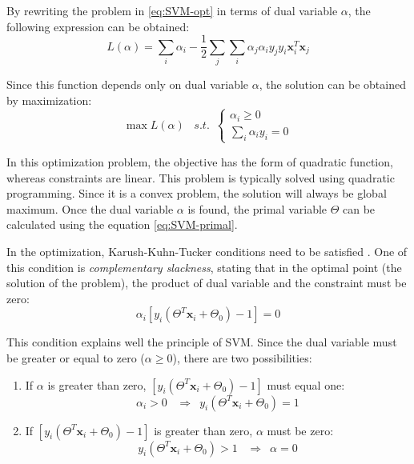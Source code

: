 By rewriting the problem in \ref{eq:SVM-opt} in terms of dual variable $\alpha$, the following expression can be obtained:
\begin{equation} \label{eq:SVM-rewritten}
L(\alpha) = \sum_i \alpha_i - \frac{1}{2} \sum_j \sum_i \alpha_j \alpha_i y_j y_i \mathbf{x}_i^T \mathbf{x}_j
\end{equation}

Since this function depends only on dual variable $\alpha$, the solution can be obtained by maximization:
\begin{equation} 
\max L(\alpha) \,\,\,\,\, s.t. \,\,\, \left\{\begin{array}{lr} \alpha_i \geq 0 \\
\sum_{i} \alpha_i y_i = 0  \end{array}\right.
\end{equation}

In this optimization problem, the objective has the form of quadratic function, whereas constraints are linear. This problem is typically solved using quadratic programming. Since it is a convex problem, the solution will always be global maximum. Once the dual variable $\alpha$ is found, the primal variable $\Theta$ can be calculated using the equation \ref{eq:SVM-primal}.

In the optimization, Karush-Kuhn-Tucker conditions need to be satisfied \citep{Boyd2004}. One of this condition is \emph{complementary slackness}, stating that in the optimal point (the solution of the problem), the product of dual variable and the constraint must be zero:
\begin{equation} 
\alpha_i \left[ y_i \left( \Theta^T\mathbf{x}_i + \Theta_0  \right) -1 \right] = 0
\end{equation}

This condition explains well the principle of SVM. Since the dual variable must be greater or equal to zero ($\alpha \geq 0$), there are two possibilities:
\begin{enumerate}
\item
If $\alpha$ is greater than zero, $\left[ y_i \left( \Theta^T\mathbf{x}_i + \Theta_0  \right) -1 \right]$ must equal one:
\begin{equation} 
\alpha_i > 0 \,\,\,\,\, \Rightarrow \,\,\,  y_i \left( \Theta^T\mathbf{x}_i + \Theta_0  \right) = 1
\end{equation}
\item
If $\left[ y_i \left( \Theta^T\mathbf{x}_i + \Theta_0  \right) -1 \right]$ is greater than zero, $\alpha$ must be zero:
\begin{equation} 
y_i \left( \Theta^T\mathbf{x}_i + \Theta_0  \right) > 1 \,\,\,\,\, \Rightarrow \,\,\,  \alpha = 0
\end{equation}
\end{enumerate}

